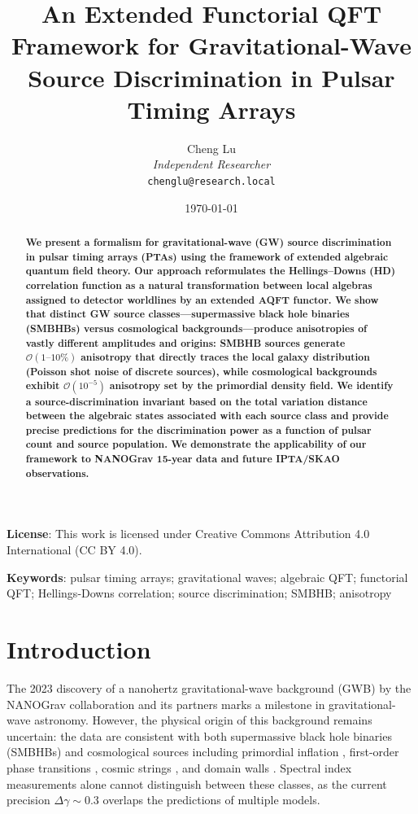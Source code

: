 \documentclass[11pt,a4paper]{article}
\title{\textbf{An Extended Functorial QFT Framework for Gravitational-Wave Source Discrimination in Pulsar Timing Arrays}}
\author{Cheng Lu\\
\textit{Independent Researcher}\\
\vspace{0.5em}
\texttt{chenglu@research.local}
}
\date{\today}
\begin{document}
\maketitle

\begin{abstract}
\textbf{We present a formalism for gravitational-wave (GW) source discrimination in pulsar timing arrays (PTAs) using the framework of extended algebraic quantum field theory. Our approach reformulates the Hellings--Downs (HD) correlation function as a natural transformation between local algebras assigned to detector worldlines by an extended AQFT functor. We show that distinct GW source classes---supermassive black hole binaries (SMBHBs) versus cosmological backgrounds---produce anisotropies of vastly different amplitudes and origins: SMBHB sources generate $\mathcal{O}(1\text{--}10\%)$ anisotropy that directly traces the local galaxy distribution (Poisson shot noise of discrete sources), while cosmological backgrounds exhibit $\mathcal{O}(10^{-5})$ anisotropy set by the primordial density field. We identify a source-discrimination invariant based on the total variation distance between the algebraic states associated with each source class and provide precise predictions for the discrimination power as a function of pulsar count and source population. We demonstrate the applicability of our framework to NANOGrav 15-year data and future IPTA/SKAO observations.}
\end{abstract}

\vspace{0.5em}
\noindent\textbf{License}: This work is licensed under Creative Commons Attribution 4.0 International (CC BY 4.0).

\vspace{0.5em}
\noindent\textbf{Keywords}: pulsar timing arrays; gravitational waves; algebraic QFT; functorial QFT; Hellings-Downs correlation; source discrimination; SMBHB; anisotropy

\tableofcontents

\section{Introduction}\label{sec:intro}

The 2023 discovery of a nanohertz gravitational-wave background (GWB) by the NANOGrav collaboration and its partners \cite{Agazie:2023} marks a milestone in gravitational-wave astronomy. However, the physical origin of this background remains uncertain: the data are consistent with both supermassive black hole binaries (SMBHBs) \cite{Phinney:2001} and cosmological sources including primordial inflation \cite{Magueijo:2007}, first-order phase transitions \cite{Caprini:2020}, cosmic strings \cite{Vilenkin:1984}, and domain walls \cite{Hindmarsh:2017}. Spectral index measurements alone cannot distinguish between these classes, as the current precision $\Delta\gamma \sim 0.3$ overlaps the predictions of multiple models.
\end{document}
